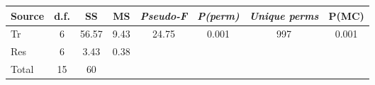 \begin{tabular}{lccccccc}
	\toprule
		\textbf{Source}	& \textbf{d.f.}	& \textbf{SS}	& \textbf{MS}	& \textbf{\emph{Pseudo-F}}	& \textbf{\emph{P(perm)}}	& \textbf{\emph{Unique perms}}	& \textbf{P(MC)} \\
	\midrule
		Tr				& \num{6}		& \num{56,57}	& \num{9,43}	& \num{24,75}		& \num{0,001}		& \num{997}				& \num{0,001} \\[\spbtwrowsA]
		Res				& \num{6}		& \num{3,43}	& \num{0,38}	& 					& 					& 						&  \\[\spbtwrowsA]
		Total			& \num{15}		& \num{60}		& 				& 					& 					& 						&  \\[\spbtwrowsA]
	\bottomrule
\end{tabular}